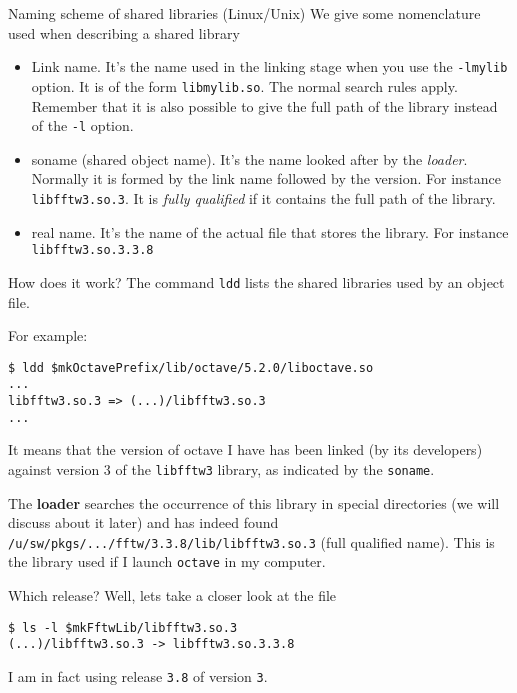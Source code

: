 \documentclass[10pt]{beamer}
\begin{document}
\begin{frame}{Naming scheme of shared libraries (Linux/Unix)}
We give some nomenclature used when describing a shared library

\begin{itemize}
\item Link name. It's the name used in the linking stage when
you use the \texttt{-lmylib} option.  It is of the
form \texttt{libmylib.so}. The normal search rules
apply. Remember that it is also possible to give the full path of
the library instead of the \texttt{-l} option.
\item soname (shared object name).  It's the name looked after
by the \emph{loader}.  Normally it is formed by the link name
followed by the version.  For instance
\texttt{libfftw3.so.3}. It is \emph{fully
qualified} if it contains the full path of the library.
\item real name. It's the name of the actual file that stores the library. 
For instance \texttt{libfftw3.so.3.3.8}
\end{itemize}
\end{frame}


\begin{frame}[fragile]{How does it work?}  The command
\texttt{ldd} lists the shared libraries used by an object file.

For example:
\begin{verbatim}
$ ldd $mkOctavePrefix/lib/octave/5.2.0/liboctave.so
...
libfftw3.so.3 => (...)/libfftw3.so.3
...
\end{verbatim}
It means that the version of octave I have has been linked (by its
developers) against version $3$ of the \texttt{libfftw3} library, 
as indicated by the \texttt{soname}.

The \textbf{loader} searches the occurrence of this library in special
directories (we will discuss about it later) and has indeed found
\texttt{/u/sw/pkgs/.../fftw/3.3.8/lib/libfftw3.so.3} (full qualified name). This is the library used if I launch \texttt{octave} in my computer. \smallskip

Which release? Well, lets take a closer look at the file
\begin{verbatim}
$ ls -l $mkFftwLib/libfftw3.so.3
(...)/libfftw3.so.3 -> libfftw3.so.3.3.8
\end{verbatim}
I am in fact using release \texttt{3.8} of version \texttt{3}.
\end{frame}
\end{document}
